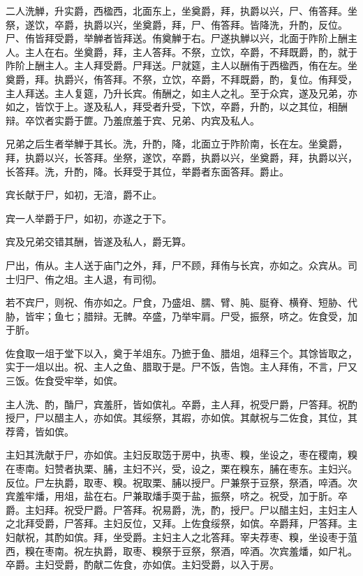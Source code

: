 \documentclass[]{article}
\begin{document}
二人洗觯，升实爵，西楹西，北面东上，坐奠爵，拜，执爵以兴，尸、侑答拜。坐祭，遂饮，卒爵，执爵以兴，坐奠爵，拜，尸、侑答拜。皆降洗，升酌，反位。尸、侑皆拜受爵，举觯者皆拜送。侑奠觯于右。尸遂执觯以兴，北面于阼阶上酬主人。主人在右。坐奠爵，拜，主人答拜。不祭，立饮，卒爵，不拜既爵，酌，就于阼阶上酬主人。主人拜受爵。尸拜送。尸就筵，主人以酬侑于西楹西，侑在左。坐奠爵，拜。执爵兴，侑答拜。不祭，立饮，卒爵，不拜既爵，酌，复位。侑拜受，主人拜送。主人复筵，乃升长宾。侑酬之，如主人之礼。至于众宾，遂及兄弟，亦如之，皆饮于上。遂及私人，拜受者升受，下饮，卒爵，升酌，以之其位，相酬辩。卒饮者实爵于篚。乃羞庶羞于宾、兄弟、内宾及私人。

兄弟之后生者举觯于其长。洗，升酌，降，北面立于阼阶南，长在左。坐奠爵，拜，执爵以兴，长答拜。坐祭，遂饮，卒爵，执爵以兴，坐奠爵，拜，执爵以兴，长答拜。洗，升酌，降。长拜受于其位，举爵者东面答拜。爵止。

宾长献于尸，如初，无湆，爵不止。

宾一人举爵于尸，如初，亦遂之于下。

宾及兄弟交错其酬，皆遂及私人，爵无算。

尸出，侑从。主人送于庙门之外，拜，尸不顾，拜侑与长宾，亦如之。众宾从。司士归尸、侑之俎。主人退，有司彻。

若不宾尸，则祝、侑亦如之。尸食，乃盛俎、臑、臂、肫、脡脊、横脊、短胁、代胁，皆牢；鱼七；腊辩。无髀。卒盛，乃举牢肩。尸受，振祭，哜之。佐食受，加于肵。

佐食取一俎于堂下以入，奠于羊俎东。乃摭于鱼、腊俎，俎释三个。其馀皆取之，实于一俎以出。祝、主人之鱼、腊取于是。尸不饭，告饱。主人拜侑，不言，尸又三饭。佐食受牢举，如傧。

主人洗、酌，酳尸，宾羞肝，皆如傧礼。卒爵，主人拜，祝受尸爵，尸答拜。祝酌授尸，尸以醋主人，亦如傧。其绥祭，其嘏，亦如傧。其献祝与二佐食，其位，其荐脀，皆如傧。

主妇其洗献于尸，亦如傧。主妇反取笾于房中，执枣、糗，坐设之，枣在稷南，糗在枣南。妇赞者执栗、脯，主妇不兴，受，设之，栗在糗东，脯在枣东。主妇兴。反位。尸左执爵，取枣、糗。祝取栗、脯以授尸。尸兼祭于豆祭，祭酒，啐酒。次宾羞牢燔，用俎，盐在右。尸兼取燔手耎于盐，振祭，哜之。祝受，加于肵。卒爵。主妇拜。祝受尸爵。尸答拜。祝易爵，洗，酌，授尸。尸以醋主妇，主妇主人之北拜受爵，尸答拜。主妇反位，又拜。上佐食绥祭，如傧。卒爵拜，尸答拜。主妇献祝，其酌如傧。拜，坐受爵。主妇主人之北答拜。宰夫荐枣、糗，坐设枣于菹西，糗在枣南。祝左执爵，取枣、糗祭于豆祭，祭酒，啐酒。次宾羞燔，如尸礼。卒爵。主妇受爵，酌献二佐食，亦如傧。主妇受爵，以入于房。
\end{document}

